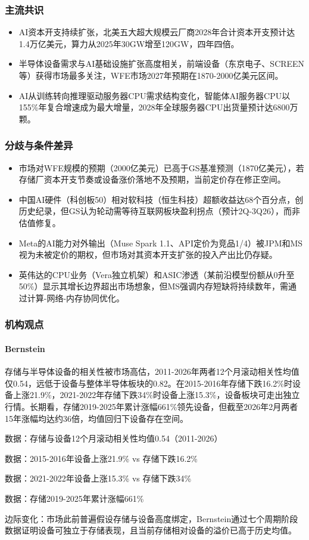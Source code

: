 \documentclass[11pt]{ctexart}
\begin{document}
\subsubsection*{主流共识}
\begin{itemize}
  \item AI资本开支持续扩张，北美五大超大规模云厂商2028年合计资本开支预计达1.4万亿美元，算力从2025年30GW增至120GW，四年四倍。
  \item 半导体设备需求与AI基础设施扩张高度相关，前端设备（东京电子、SCREEN等）获得市场最多关注，WFE市场2027年预期在1870-2000亿美元区间。
  \item AI从训练转向推理驱动服务器CPU需求结构变化，智能体AI服务器CPU以155\%年复合增速成为最大增量，2028年全球服务器CPU出货量预计达6800万颗。
\end{itemize}
\subsubsection*{分歧与条件差异}
\begin{itemize}
  \item 市场对WFE规模的预期（2000亿美元）已高于GS基准预测（1870亿美元），若存储厂资本开支节奏或设备涨价落地不及预期，当前定价存在修正空间。
  \item 中国AI硬件（科创板50）相对软科技（恒生科技）超额收益达68个百分点，创历史纪录，但GS认为轮动需等待互联网板块盈利拐点（预计2Q-3Q26），而非估值修复。
  \item Meta的AI能力对外输出（Muse Spark 1.1、API定价为竞品1/4）被JPM和MS视为未被定价的期权，但市场对其资本开支扩张的投入产出比仍存疑。
  \item 英伟达的CPU业务（Vera独立机架）和ASIC渗透（某前沿模型份额从0升至50\%）显示其增长边界超出市场想象，但MS强调内存短缺将持续数年，需通过计算-网络-内存协同优化。
\end{itemize}
\subsubsection*{机构观点}
\paragraph{Bernstein} 存储与半导体设备的相关性被市场高估，2011-2026年两者12个月滚动相关性均值仅0.54，远低于设备与整体半导体板块的0.82。在2015-2016年存储下跌16.2\%时设备上涨21.9\%，2021-2022年存储下跌34\%时设备上涨15.3\%，设备板块可走出独立行情。长期看，存储2019-2025年累计涨幅661\%领先设备，但截至2026年2月两者15年涨幅均达约36倍，均值回归下设备存在空间。
{\small\color{refgray}数据：存储与设备12个月滚动相关性均值0.54（2011-2026）\par}
{\small\color{refgray}数据：2015-2016年设备上涨21.9\% vs 存储下跌16.2\%\par}
{\small\color{refgray}数据：2021-2022年设备上涨15.3\% vs 存储下跌34\%\par}
{\small\color{refgray}数据：存储2019-2025年累计涨幅661\%\par}
{\small\color{refgray}边际变化：市场此前普遍假设存储与设备高度绑定，Bernstein通过七个周期阶段数据证明设备可独立于存储表现，且当前存储相对设备的溢价已高于历史均值。\par}
\end{document}
